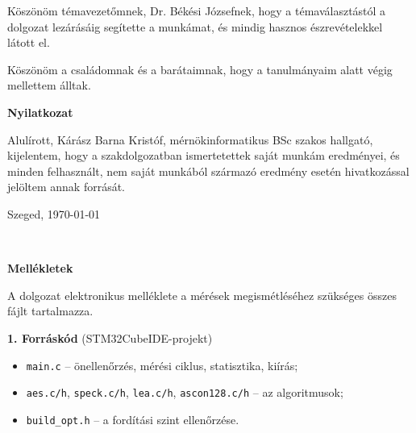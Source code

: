 \documentclass[a4paper,12pt]{report}
\theoremstyle{definition}
\theoremstyle{remark}
\begin{document}
\vspace{2 cm}

Köszönöm témavezetőmnek, Dr. Békési Józsefnek, hogy a témaválasztástól a dolgozat lezárásáig segítette a munkámat, és mindig hasznos észrevételekkel látott el.

Köszönöm a családomnak és a barátaimnak, hogy a tanulmányaim alatt végig mellettem álltak.

\newpage
{\Huge \bf Nyilatkozat}


\vspace{2 cm}

Alulírott, Kárász Barna Kristóf, mérnökinformatikus BSc szakos hallgató, kijelentem, hogy a szakdolgozatban ismertetettek saját munkám eredményei, és minden felhasznált, nem saját munkából származó eredmény esetén hivatkozással jelöltem annak forrását.


\begin{flushleft}
\vspace*{1cm}
Szeged, \today
\end{flushleft}

\begin{flushright}
 \vspace*{1cm}
 \makebox[7cm]{\rule{6cm}{.4pt}}\\
\end{flushright}

\pagebreak

\newpage
{\Huge \bf Mellékletek}


\vspace{2 cm}

A dolgozat elektronikus melléklete a mérések megismétléséhez szükséges összes fájlt tartalmazza. %

\medskip
\noindent\textbf{1. Forráskód} (STM32CubeIDE-projekt)
\begin{itemize}
	\item \texttt{main.c} -- önellenőrzés, mérési ciklus, statisztika, kiírás;
	\item \texttt{aes.c/h}, \texttt{speck.c/h}, \texttt{lea.c/h}, \texttt{ascon128.c/h} -- az algoritmusok;
	\item \texttt{build\_opt.h} -- a fordítási szint ellenőrzése.
\end{itemize}
\end{document}
